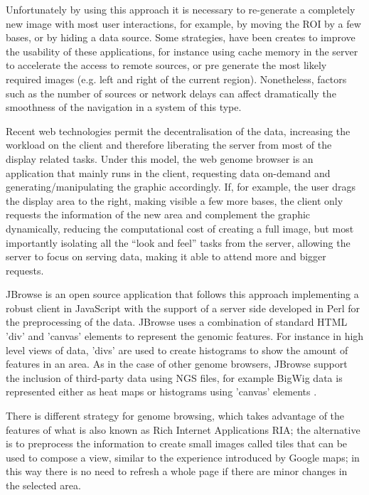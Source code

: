 Unfortunately by using this approach it is necessary to re-generate a completely new image with most user interactions, for example, by moving the ROI by a few bases, or by hiding a data source. Some strategies, have been creates to improve the usability of these applications, for instance using cache memory in the server to accelerate the access to remote sources, or pre generate the most likely required images (e.g. left and right of the current region). Nonetheless, factors such as the number of sources or network delays can affect dramatically the smoothness of the navigation in a system of this type.

Recent web technologies permit the decentralisation of the data, increasing the workload on the client and therefore liberating the server from most of the display related tasks. Under this model, the web genome browser is an application that mainly runs in the client, requesting data on-demand and generating/manipulating the graphic accordingly. If, for example, the user drags the display area to the right, making visible a few more bases, the client only requests the information of the new area and complement the graphic dynamically, reducing the computational cost of creating a full image, but most importantly isolating all the ``look and feel'' tasks from the server, allowing the server to focus on serving data, making it able to attend more and bigger requests.

JBrowse is an open source application that follows this approach implementing a robust client in JavaScript with the support of a server side developed in Perl for the preprocessing of the data. JBrowse uses a combination of standard HTML 'div' and 'canvas' elements to represent the genomic features. For instance in high level views of data, 'divs' are used to create histograms to show the amount of features in an area. As in the case of other genome browsers, JBrowse support the inclusion of third-party data using NGS files, for example BigWig data is represented either as heat maps or histograms using 'canvas' elements \cite{LEE2013}.

There is different strategy for genome browsing, which takes advantage of the features of what is also known as Rich Internet Applications RIA; the alternative is to preprocess the information to create small images called tiles that can be used to compose a view, similar to the experience introduced by Google maps; in this way there is no need to refresh a whole page if there are minor changes in the selected area. 

